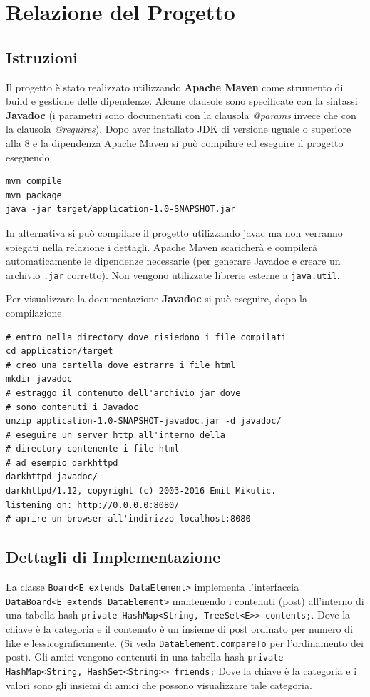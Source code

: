 \documentclass[12pt]{report}
\begin{document}
\chapter{Relazione del Progetto}

\section{Istruzioni}

Il progetto è stato realizzato utilizzando \textbf{Apache Maven} come strumento di build e gestione delle dipendenze.
Alcune clausole sono specificate con la sintassi \textbf{Javadoc}
(i parametri sono documentati con la clausola \textit{@params} invece che con la clausola \textit{@requires}).
Dopo aver installato JDK di versione uguale o superiore alla 8 e la dipendenza Apache Maven
si può compilare ed eseguire il progetto eseguendo.
\begin{lstlisting}[style=bash]
mvn compile
mvn package
java -jar target/application-1.0-SNAPSHOT.jar
\end{lstlisting}

In alternativa si può compilare il progetto utilizzando javac ma non verranno spiegati nella relazione i dettagli.
Apache Maven scaricherà e compilerà automaticamente le dipendenze necessarie (per generare Javadoc e creare un archivio \verb|.jar| corretto).
Non vengono utilizzate librerie esterne a \verb|java.util|.

Per visualizzare la documentazione \textbf{Javadoc} si può eseguire, dopo la compilazione
\begin{lstlisting}[style=bash]
# entro nella directory dove risiedono i file compilati
cd application/target
# creo una cartella dove estrarre i file html
mkdir javadoc
# estraggo il contenuto dell'archivio jar dove
# sono contenuti i Javadoc
unzip application-1.0-SNAPSHOT-javadoc.jar -d javadoc/
# eseguire un server http all'interno della
# directory contenente i file html
# ad esempio darkhttpd
darkhttpd javadoc/
darkhttpd/1.12, copyright (c) 2003-2016 Emil Mikulic.
listening on: http://0.0.0.0:8080/
# aprire un browser all'indirizzo localhost:8080
\end{lstlisting}

\section{Dettagli di Implementazione}
La classe \verb|Board<E extends DataElement>| implementa l'interfaccia \\
\verb|DataBoard<E extends DataElement>|
mantenendo i contenuti (post) all'interno di una tabella hash \verb|private HashMap<String, TreeSet<E>> contents;|.
Dove la chiave è la categoria e il contenuto è un insieme di post ordinato per numero di like e lessicograficamente.
(Si veda \verb|DataElement.compareTo| per l'ordinamento dei post). Gli amici vengono
contenuti in una tabella hash \verb|private HashMap<String, HashSet<String>> friends;|
Dove la chiave è la categoria e i valori sono gli insiemi di amici che possono visualizzare tale categoria.
\end{document}
